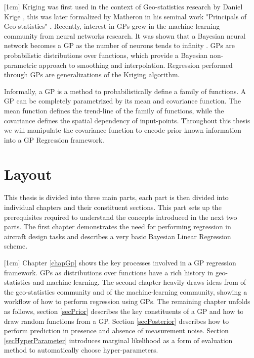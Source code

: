 [1cm]
Kriging was first used in the context of Geo-statistics research by Daniel Krige \cite{krige1951statistical}, this was later formalized by Matheron in his seminal work "Principals of Geo-statistics" \cite{matheron1963principles}. Recently, interest in GPs grew in the machine learning community from neural networks research. It was shown that a Bayesian neural network becomes a GP as the number of neurons tends to infinity \cite{neal2012bayesian}. GPs are probabilistic distributions over functions, which provide a Bayesian non-parametric approach to smoothing and interpolation. Regression performed through GPs are generalizations of the Kriging algorithm. 

Informally, a GP is a method to probabilistically define a family of functions. A GP can be completely parametrized by its mean and covariance function. The mean function defines the trend-line of the family of functions, while the covariance defines the spatial dependency of input-points. Throughout this thesis we will manipulate the covariance function to encode prior known information into a GP Regression framework. 

\section{Layout}\label{secOutline}
This thesis is divided into three main parts, each part is then divided into individual chapters and their constituent sections. This part sets up the prerequisites required to understand the concepts introduced in the next two parts. The first chapter demonstrates the need for performing regression in aircraft design tasks and describes a very basic Bayesian Linear Regression scheme. 

[1cm]
Chapter \ref{chapGp} shows the key processes involved in a GP regression framework. GPs as distributions over functions have a rich history in geo-statistics and machine learning. The second chapter heavily draws ideas from \cite{krige1951statistical, matheron1963principles} of the geo-statistics community and \cite{Stein1999Springer, kennedy2000predicting, Rasmussen2005, mackay2003information} of the machine-learning community, showing a workflow of how to perform regression using GPs. The remaining chapter unfolds as follows, section \ref{secPrior} describes the key constituents of a GP and how to draw random functions from a GP. Section \ref{secPosterior} describes how to perform prediction in presence and absence of measurement noise. Section \ref{secHyperParameter} introduces marginal likelihood as a form of evaluation method to automatically choose hyper-parameters. 

